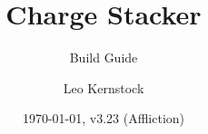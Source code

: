 \title{Charge Stacker}
\subtitle{Build Guide}
\author{Leo Kernstock}
\date{\today, v3.23 (Affliction)}
\maketitle
